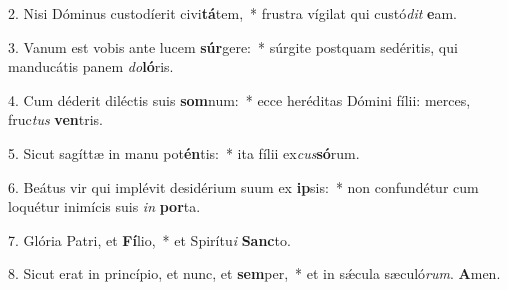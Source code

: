 2. Nisi Dóminus custodíerit civi\textbf{tá}tem,~*  frustra vígilat qui custó\textit{dit} \textbf{e}am.\

3. Vanum est vobis ante lucem \textbf{súr}gere:~*  súrgite postquam sedéritis, qui manducátis panem \textit{do}\textbf{ló}ris.\

4. Cum déderit diléctis suis \textbf{som}num:~*  ecce heréditas Dómini fílii: merces, fruc\textit{tus} \textbf{ven}tris.\

5. Sicut sagíttæ in manu pot\textbf{én}tis:~*  ita fílii ex\textit{cus}\textbf{só}rum.\

6. Beátus vir qui implévit desidérium suum ex \textbf{ip}sis:~*  non confundétur cum loquétur inimícis suis \textit{in} \textbf{por}ta.\

7. Glória Patri, et \textbf{Fí}lio,~*  et Spirítu\textit{i} \textbf{Sanc}to.\

8. Sicut erat in princípio, et nunc, et \textbf{sem}per,~*  et in sǽcula sæculó\textit{rum}. \textbf{A}men.\

